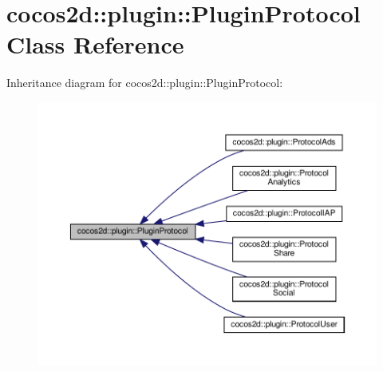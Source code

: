 \hypertarget{classcocos2d_1_1plugin_1_1PluginProtocol}{}\section{cocos2d\+:\+:plugin\+:\+:Plugin\+Protocol Class Reference}
\label{classcocos2d_1_1plugin_1_1PluginProtocol}


Inheritance diagram for cocos2d\+:\+:plugin\+:\+:Plugin\+Protocol\+:
\nopagebreak
\begin{figure}[H]
\begin{center}
\leavevmode
\includegraphics[width=350pt]{classcocos2d_1_1plugin_1_1PluginProtocol__inherit__graph}
\end{center}
\end{figure}
